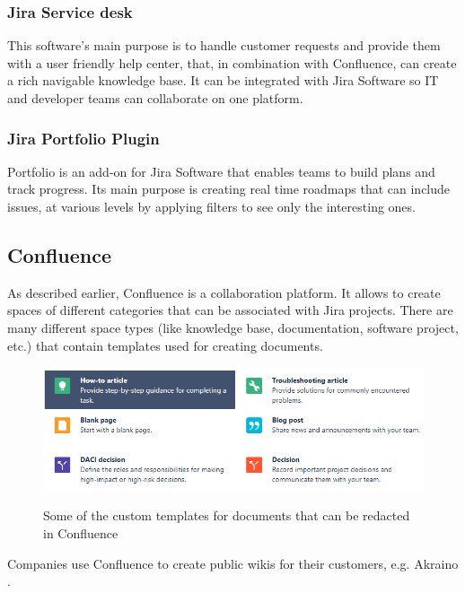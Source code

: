 		\subsubsection{Jira Service desk}\label{subsec:service_desk}
			This software's main purpose is to handle customer requests and provide them with a user friendly help center, that, in combination with Confluence, can create a rich navigable knowledge base.
			It can be integrated with Jira Software so IT and developer teams can collaborate on one platform.

		\subsubsection{Jira Portfolio Plugin}\label{subsec:portfolio}
			Portfolio \cite{portfolio} is an add-on for Jira Software that enables teams to build plans and track progress.
			Its main purpose is creating real time roadmaps that can include issues, at various levels by applying filters to see only the interesting ones. 
		
	\subsection{Confluence}
		As described earlier, Confluence is a collaboration platform.
		It allows to create spaces of different categories that can be associated with Jira projects.
		There are many different space types (like knowledge base, documentation, software project, etc.) that contain templates used for creating documents.
		\begin{figure}[H]
			\centering
			\includegraphics[width=\textwidth]{resources/Annotation2019-07-24180136}\\
			\caption[Some custom templates for Confluence documents]{Some of the custom templates for documents that can be redacted in Confluence}
		\end{figure}
		Companies use Confluence to create public wikis for their customers, e.g. Akraino \cite{akraino}.
		

